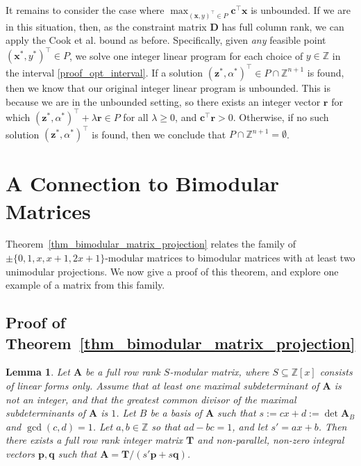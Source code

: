 \documentclass[a4paper, 11pt]{article}
\newcommand{\Z}{\mathbb{Z}}
\newcommand{\bA}{\bm{A}}
\newcommand{\bD}{\bm{D}}
\newcommand{\bx}{\bm{x}}
\newcommand{\bc}{\bm{c}}
\newcommand{\bp}{\bm{p}}
\newcommand{\bq}{\bm{q}}
\newcommand{\br}{\bm{r}}
\newcommand{\bz}{\bm{z}}
\newcommand{\bT}{\bm{T}}
\newcommand{\indet}{x}
\newcommand{\polyring}{\Z[\indet]}
\newcommand{\polyS}{S}
\newtheorem{lemma}{Lemma}
\begin{document}
It remains to consider the case where $\max_{(\bx,y)^\top\in P} \bc^\top\bx$ is unbounded. If we are in this situation, then, as the constraint matrix $\bD$ has full column rank, we can apply the Cook et al. bound as before. Specifically, given \emph{any} feasible point $(\bx^*,y^*)^\top\in P$, we solve one integer linear program for each choice of $y\in \Z$ in the interval \eqref{proof_opt_interval}. 
If a solution $(\bz^*,\alpha^*)^\top\in P\cap\Z^{n+1}$ is found, then we know that our original integer linear program is unbounded. This is because we are in the unbounded setting, so there exists an integer vector $\br$ for which $(\bz^*,\alpha^*)^\top+\lambda\br\in P$ for all $\lambda\geq 0$, and $\bc^\top\br>0$. Otherwise, if no such solution $(\bz^*,\alpha^*)^\top$ is found, then we conclude that $P\cap\Z^{n+1}= \emptyset$.
\section{A Connection to Bimodular Matrices}
\label{sec_bimodular}
Theorem~\ref{thm_bimodular_matrix_projection} relates the family of $\pm\{0,1,x,x+1,2x+1\}$-modular matrices to bimodular matrices with at least two unimodular projections. We now give a proof of this theorem, and explore one example of a matrix from this family.

\subsection{Proof of Theorem~\ref{thm_bimodular_matrix_projection}}

\begin{lemma}
\label{lemma_matrix_as_projection}
Let $\bA$ be a full row rank $\polyS$-modular matrix, where $S\subseteq \polyring$ consists of linear forms only. Assume that at least one maximal subdeterminant of $\bA$ is not an integer, and that the greatest common divisor of the maximal subdeterminants of $\bA$ is $1$. Let $B$ be a basis of $\bA$ such that $s:=cx+d:=\det\bA_B$ and $\gcd(c,d)=1$. Let $a,b\in\Z$ so that $ad-bc=1$, and let $s'=ax+b$. Then there exists a full row rank integer matrix $\bT$ and non-parallel, non-zero integral vectors $\bp,\bq$ such that $\bA=\bT/(s'\bp+s\bq)$. 
\end{lemma}
\end{document}
